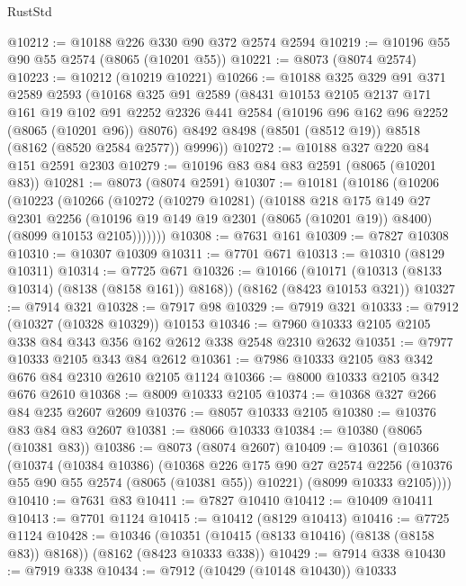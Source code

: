 \begin{lexlean}{RustStd}
\begin{coremodule}
@10212 := @10188 @226 @330 @90 @372 @2574 @2594
@10219 := @10196 @55 @90 @55 @2574 (@8065 (@10201 @55))
@10221 := @8073 (@8074 @2574)
@10223 := @10212 (@10219 @10221)
@10266 := @10188
    @325
    @329
    @91
    @371
    @2589
    @2593
    (@10168
      @325
      @91
      @2589
      (@8431
        @10153
        @2105
        @2137
        @171
        @161
        @19
        @102
        @91
        @2252
        @2326
        @441
        @2584
        (@10196 @96 @162 @96 @2252 (@8065 (@10201 @96)) @8076)
        @8492
        @8498
        (@8501 (@8512 @19))
        @8518
        (@8162 (@8520 @2584 @2577))
        @9996))
@10272 := @10188 @327 @220 @84 @151 @2591 @2303
@10279 := @10196 @83 @84 @83 @2591 (@8065 (@10201 @83))
@10281 := @8073 (@8074 @2591)
@10307 := @10181
    (@10186
      (@10206
        (@10223
          (@10266
            (@10272
              (@10279 @10281)
              (@10188
                @218
                @175
                @149
                @27
                @2301
                @2256
                (@10196 @19 @149 @19 @2301 (@8065 (@10201 @19)) @8400)
                (@8099 @10153 @2105)))))))
@10308 := @7631 @161
@10309 := @7827 @10308
@10310 := @10307 @10309
@10311 := @7701 @671
@10313 := @10310 (@8129 @10311)
@10314 := @7725 @671
@10326 := @10166
    (@10171 (@10313 (@8133 @10314) (@8138 (@8158 @161)) @8168))
    (@8162 (@8423 @10153 @321))
@10327 := @7914 @321
@10328 := @7917 @98
@10329 := @7919 @321
@10333 := @7912 (@10327 (@10328 @10329)) @10153
@10346 := @7960 @10333 @2105 @2105 @338 @84 @343 @356 @162 @2612 @338 @2548 @2310 @2632
@10351 := @7977 @10333 @2105 @343 @84 @2612
@10361 := @7986 @10333 @2105 @83 @342 @676 @84 @2310 @2610 @2105 @1124
@10366 := @8000 @10333 @2105 @342 @676 @2610
@10368 := @8009 @10333 @2105
@10374 := @10368 @327 @266 @84 @235 @2607 @2609
@10376 := @8057 @10333 @2105
@10380 := @10376 @83 @84 @83 @2607
@10381 := @8066 @10333
@10384 := @10380 (@8065 (@10381 @83))
@10386 := @8073 (@8074 @2607)
@10409 := @10361
    (@10366
      (@10374
        (@10384 @10386)
        (@10368
          @226
          @175
          @90
          @27
          @2574
          @2256
          (@10376 @55 @90 @55 @2574 (@8065 (@10381 @55)) @10221)
          (@8099 @10333 @2105))))
@10410 := @7631 @83
@10411 := @7827 @10410
@10412 := @10409 @10411
@10413 := @7701 @1124
@10415 := @10412 (@8129 @10413)
@10416 := @7725 @1124
@10428 := @10346
    (@10351 (@10415 (@8133 @10416) (@8138 (@8158 @83)) @8168))
    (@8162 (@8423 @10333 @338))
@10429 := @7914 @338
@10430 := @7919 @338
@10434 := @7912 (@10429 (@10148 @10430)) @10333

\end{coremodule}
\end{lexlean}
